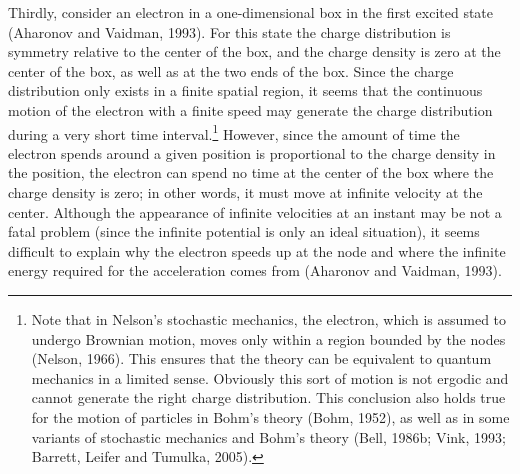 Thirdly, consider an electron in a one-dimensional box in the first excited state (Aharonov and Vaidman, 1993). 
For this state the charge distribution is symmetry relative to the center of the box, and the charge density is zero at the center of the box, as well as at the two ends of the box. 
Since the charge distribution only exists in a finite spatial region, it seems that the continuous motion of the electron with a finite speed may generate the charge distribution during a very short time interval.\footnote{Note that in Nelson's stochastic mechanics, the electron, which is assumed to undergo Brownian motion, moves only within a region bounded by the nodes (Nelson, 1966). This ensures that the theory can be equivalent to quantum mechanics in a limited sense. Obviously this sort of motion is not ergodic and cannot generate the right charge distribution. This conclusion also holds true for the motion of particles in Bohm's theory (Bohm, 1952), as well as in some variants of stochastic mechanics and Bohm's theory (Bell, 1986b; Vink, 1993; Barrett, Leifer and Tumulka, 2005).}  
However, since the amount of time the electron spends around a given position is proportional to the charge density in the position, the electron can spend no time at the center of the box where the charge density is zero; in other words, it must move at infinite velocity at the center. 
Although the appearance of infinite velocities at an instant may be not a fatal problem (since the infinite potential is only an ideal situation), it seems difficult to explain why the electron speeds up at the node and where the infinite energy required for the acceleration comes from (Aharonov and Vaidman, 1993).
 
